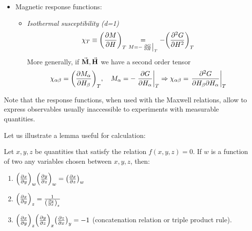 \documentclass[../../Main/Main.tex]{subfiles}
\begin{document}
\begin{itemize}
    \item  Magnetic response functions:
    \begin{itemize}
        \item \emph{Isothermal susceptibility (d=1)} 
        \begin{equation}
        \chi_T \equiv \qty(\pdv{M}{H} )_T
        \underset{M = -\eval{\pdv{G}{H}}_T }{=} - \qty(\pdv[2]{G}{H} )_T
        \label{eq:}
        \end{equation}
    More generally, if \( \va{M}, \va{H}\) we have a second order tensor
        \begin{equation}
        \chi _{\alpha \beta } = \qty(\pdv{M_ \alpha }{H_ \beta } )_T ,
        \quad M_ \alpha = -\eval{\pdv{G}{H_ \alpha }}_T \Rightarrow
        \chi _{\alpha \beta } = \eval{\pdv{G}{H_ \beta }{H_ \alpha }}_T
        \label{eq:}
        \end{equation}
    \end{itemize}
\end{itemize}

\begin{remark}
Note that the response functions, when used with the Maxwell relations, allow to express observables usually inaccessible to experiments with measurable quantities.
\end{remark}


Let us illustrate a lemma useful for calculation:

\begin{lemma}{}{}
  \label{th:2_1}
Let \(x,y,z  \)  be quantities that satisfy the relation \( f(x,y,z)=0 \). If \( w \)  is a function of  two any variables chosen between  \(x,y,z  \), then:
\begin{enumerate}
\item \( \qty(\pdv{x}{y} )_w \qty(\pdv{y}{z} )_w = \qty(\pdv{x}{z} )_w   \)
\item \( \qty(\pdv{x}{y} )_z = \frac{1}{\qty(\pdv{y}{x} )_z }  \)
\item \( \qty(\pdv{x}{y} )_z \qty(\pdv{y}{z} )_x  \qty(\pdv{z}{x} )_y = -1    \)  (concatenation relation or triple product rule).
\end{enumerate}
\end{lemma}
\end{document}
